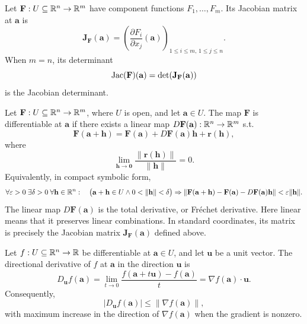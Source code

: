     \begin{definition}
        Let $\mathbf{F}:U\subseteq\mathbb{R}^n\to\mathbb{R}^m$ have component functions
        $F_1,\dots,F_m$. Its Jacobian matrix at $\mathbf{a}$ is
        \[
            \mathbf{J}_{\mathbf{F}}(\mathbf{a})
            =
            \left(\frac{\partial F_i}{\partial x_j}(\mathbf{a})\right)
            _{1\leq i\leq m,\,1\leq j\leq n}.
        \]
        When $m=n$, its determinant
        \[
            \operatorname{Jac}(\mathbf{F})(\mathbf{a})
            =
            \det\!\left(\mathbf{J}_{\mathbf{F}}(\mathbf{a})\right)
        \]
        is the Jacobian determinant.
    \end{definition}

    \begin{definition}
        Let $\mathbf{F}:U\subseteq\mathbb{R}^n\to\mathbb{R}^m$, where $U$ is open, and
        let $\mathbf{a}\in U$. The map $\mathbf{F}$ is differentiable at
        $\mathbf{a}$ if there exists a linear map
        $D\mathbf{F}(\mathbf{a}):\mathbb{R}^n\to\mathbb{R}^m$ s.t.
        \[
            \mathbf{F}(\mathbf{a}+\mathbf{h})
            =
            \mathbf{F}(\mathbf{a})
            +D\mathbf{F}(\mathbf{a})\mathbf{h}
            +\mathbf{r}(\mathbf{h}),
        \]
        where
        \[
            \lim\limits_{\mathbf{h}\to\mathbf{0}}
            \frac{\|\mathbf{r}(\mathbf{h})\|}{\|\mathbf{h}\|}
            =0.
        \]
        Equivalently, in compact symbolic form,
        {\small
        \[
            \forall\varepsilon>0\;\exists\delta>0\;\forall\mathbf{h}\in\mathbb{R}^n:\quad
            \bigl(\mathbf{a}+\mathbf{h}\in U\land0<\|\mathbf{h}\|<\delta\bigr)
            \Rightarrow
            \|\mathbf{F}(\mathbf{a}+\mathbf{h})-\mathbf{F}(\mathbf{a})
            -D\mathbf{F}(\mathbf{a})\mathbf{h}\|<\varepsilon\|\mathbf{h}\|.
        \]
        }
        The linear map $D\mathbf{F}(\mathbf{a})$ is the total derivative, or
        Fr\'echet derivative. Here linear means that it preserves linear
        combinations. In standard coordinates, its matrix is precisely the
        Jacobian matrix $\mathbf{J}_{\mathbf{F}}(\mathbf{a})$ defined above.
    \end{definition}


    \begin{definition}
        Let $f:U\subseteq\mathbb{R}^n\to\mathbb{R}$ be differentiable at
        $\mathbf{a}\in U$, and let $\mathbf{u}$ be a unit vector. The
        directional derivative of $f$ at $\mathbf{a}$ in the direction
        $\mathbf{u}$ is
        \[
            D_{\mathbf{u}}f(\mathbf{a})
            =
            \lim\limits_{t\to0}
            \frac{f(\mathbf{a}+t\mathbf{u})-f(\mathbf{a})}{t}
            =
            \nabla f(\mathbf{a})\cdot\mathbf{u}.
        \]
        Consequently,
        \[
            |D_{\mathbf{u}}f(\mathbf{a})|
            \leq
            \|\nabla f(\mathbf{a})\|,
        \]
        with maximum increase in the direction of
        $\nabla f(\mathbf{a})$ when the gradient is nonzero.
    \end{definition}

